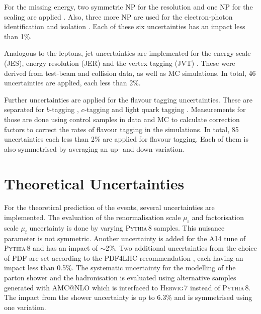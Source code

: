 \documentclass[bachelor,oneside, BCOR10mm,
			ngerman,english  %
]{GAUBM}
\begin{document}
For the missing energy, two symmetric NP for the resolution and one NP for the scaling are applied \cite{uncertainty_missingenergy}. Also, three more NP are used for the electron-photon identification and isolation \cite{uncertainty_lepton01}. Each of these six uncertainties has an impact less than 1\%.

Analogous to the leptons, jet uncertainties are implemented for the energy scale (JES), energy resolution (JER) and the vertex tagging (JVT) \cite{uncertainty_jet01}. These were derived from test-beam and collision data, as well as MC simulations. In total, 46 uncertainties are applied, each less than 2\%.

Further uncertainties are applied for the flavour tagging uncertainties. These are separated for $b$-tagging \cite{uncertainty_tagging_b}, $c$-tagging \cite{uncertainty_tagging_c} and light quark tagging \cite{uncertainty_tagging_light}. Measurements for those are done using control samples in data and MC to calculate correction factors to correct the rates of flavour tagging in the simulations. In total, 85 uncertainties each less than 2\% are applied for flavour tagging. Each of them is also symmetrised by averaging an up- and down-variation.

\section{Theoretical Uncertainties}
\label{sec:UncertaintiesTheoretical}
For the theoretical prediction of the \ttbarZ events, several uncertainties are implemented. The evaluation of the renormalisation scale $\mu_\text{r}$ and factorisation scale $\mu_\text{f}$ uncertainty is done by varying \textsc{Pythia\,8} samples. This nuisance parameter is not symmetric. Another uncertainty is added for the A14 tune of \textsc{Pythia\,8} \cite{uncertainty_ttZ01} and has an impact of $\sim$2\%. Two additional uncertainties from the choice of PDF are set according to the \textsc{PDF4LHC} recommendation \cite{uncertainty_pdf}, each having an impact less than 0.5\%. The systematic uncertainty for the modelling of the parton shower and the hadronisation is evaluated using alternative samples generated with \textsc{AMC@NLO} \cite{uncertainty_ttZ02} which is interfaced to \textsc{Herwig\,7} \cite{uncertainty_herwig} instead of \textsc{Pythia\,8}. The impact from the shower uncertainty is up to 6.3\% and is symmetrised using one variation.
\end{document}
